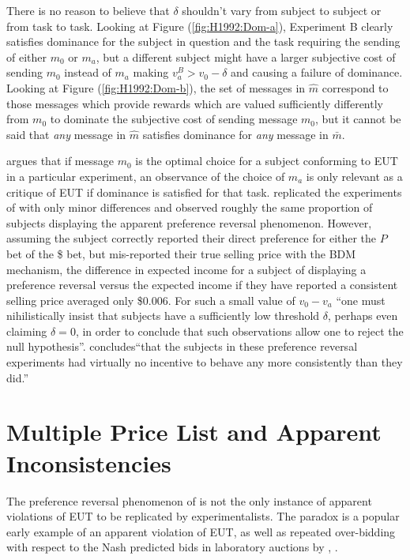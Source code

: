 \documentclass[../main.tex]{subfiles}
\begin{document}
There is no reason to believe that $\delta$ shouldn't vary from subject to subject or from task to task.
Looking at Figure (\ref{fig:H1992:Dom-a}), Experiment B clearly satisfies dominance for the subject in question and the task requiring the sending of either $m_0$ or $m_a$, but a different subject might have a larger subjective cost of sending $m_0$ instead of $m_a$ making $v_a^B > v_0 - \delta$ and causing a failure of dominance.
Looking at Figure (\ref{fig:H1992:Dom-b}), the set of messages in $\hat{m}$ correspond to those messages which provide rewards which are valued sufficiently differently from $m_0$ to dominate the subjective cost of sending message $m_0$, but it cannot be said that \textit{any} message in $\hat{m}$ satisfies dominance for \textit{any} message in $\bar{m}$.

\textcite{Harrison1989} argues that if message $m_0$ is the optimal choice for a subject conforming to EUT in a particular experiment, an observance of the choice of $m_a$ is only relevant as a critique of EUT if dominance is satisfied for that task.
\textcite{Harrison1994} replicated the experiments of\textcite{Grether1979} with only minor differences and observed roughly the same proportion of subjects displaying the apparent preference reversal phenomenon.
However, assuming the subject correctly reported their direct preference for either the $P$ bet of the {\$} bet, but mis-reported their true selling price with the BDM mechanism, the difference in expected income for a subject of displaying a preference reversal versus the expected income if they have reported a consistent selling price averaged only \${0.006}. 
For such a small value of $v_0 - v_a$ \enquote{one must nihilistically insist that subjects have a sufficiently low threshold $\delta$, perhaps even claiming $\delta = 0$, in order to conclude that such observations allow one to reject the null hypothesis}\parencite[1428]{Harrison1992}.
\textcite[237]{Harrison1994} concludes\enquote{that the subjects in these preference reversal experiments had virtually no incentive to behave any more consistently than they did.}

\singlespacing
\section{\texorpdfstring{\textcite{Holt2002}}{Holt \& Laury (2002)} Multiple Price List and Apparent Inconsistencies}
\doublespacing

The preference reversal phenomenon of \textcite{Grether1979} is not the only instance of apparent violations of EUT to be replicated by experimentalists.
The \textcite{Ellsberg1961} paradox is a popular early example of an apparent violation of EUT, as well as repeated over-bidding with respect to the Nash predicted bids in laboratory auctions by \textcite{Cox1982}, \textcite{Cox1983, Cox1983a, Cox1988}.
\end{document}
